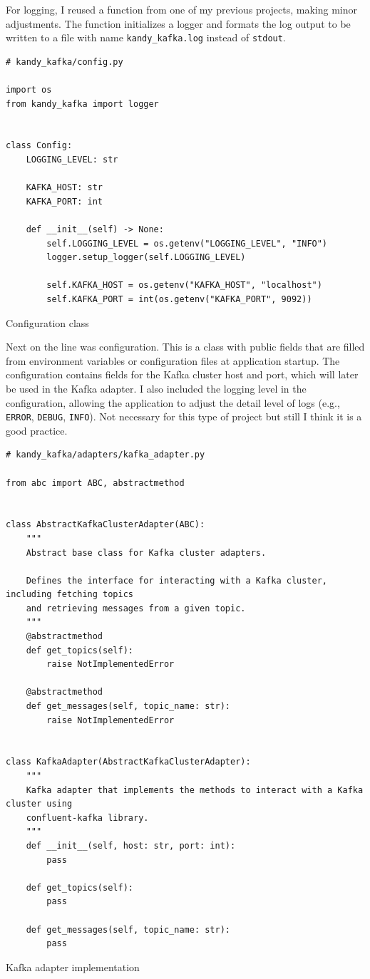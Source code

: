 \documentclass[10pt , a4paper]{report}
\newenvironment{code}{\captionsetup{type=listing}}{}
\begin{document}
For logging, I reused a function from one of my previous projects, making minor adjustments. The function initializes a logger and formats the log output to be written to a file with name \texttt{kandy\_kafka.log} instead of \texttt{stdout}.


\begin{code}
  \begin{verbatim}
# kandy_kafka/config.py

import os
from kandy_kafka import logger


class Config:
    LOGGING_LEVEL: str

    KAFKA_HOST: str
    KAFKA_PORT: int

    def __init__(self) -> None:
        self.LOGGING_LEVEL = os.getenv("LOGGING_LEVEL", "INFO")
        logger.setup_logger(self.LOGGING_LEVEL)

        self.KAFKA_HOST = os.getenv("KAFKA_HOST", "localhost")
        self.KAFKA_PORT = int(os.getenv("KAFKA_PORT", 9092))
  \end{verbatim}
\caption{Configuration class}
\end{code}

Next on the line was configuration. This is a class with public fields that are filled from environment variables or configuration files at application startup. The configuration contains fields for the Kafka cluster host and port, which will later be used in the Kafka adapter. I also included the logging level in the configuration, allowing the application to adjust the detail level of logs (e.g., \texttt{ERROR}, \texttt{DEBUG}, \texttt{INFO}). Not necessary for this type of project but still I think it is a good practice.

\begin{code}
  \begin{verbatim}
# kandy_kafka/adapters/kafka_adapter.py

from abc import ABC, abstractmethod


class AbstractKafkaClusterAdapter(ABC):
    """
    Abstract base class for Kafka cluster adapters.

    Defines the interface for interacting with a Kafka cluster, including fetching topics
    and retrieving messages from a given topic.
    """
    @abstractmethod
    def get_topics(self):
        raise NotImplementedError

    @abstractmethod
    def get_messages(self, topic_name: str):
        raise NotImplementedError


class KafkaAdapter(AbstractKafkaClusterAdapter):
    """
    Kafka adapter that implements the methods to interact with a Kafka cluster using
    confluent-kafka library.
    """
    def __init__(self, host: str, port: int):
        pass

    def get_topics(self):
        pass

    def get_messages(self, topic_name: str):
        pass
  \end{verbatim}
\caption{Kafka adapter implementation}
\end{code}
\end{document}
